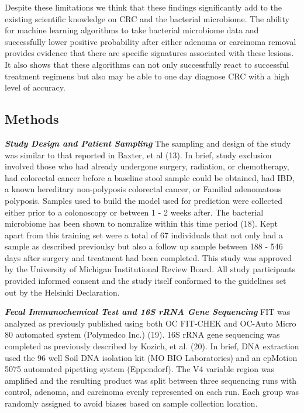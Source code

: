 \documentclass[12pt,]{article}
\begin{document}
Despite these limitations we think that these findings significantly add
to the existing scientific knowledge on CRC and the bacterial
microbiome. The ability for machine learning algorithms to take
bacterial microbiome data and successfully lower positive probability
after either adenoma or carcinoma removal provides evidence that there
are specific signatures associated with these lesions. It also shows
that these algorithms can not only successfully react to successful
treatment regimens but also may be able to one day diagnose CRC with a
high level of accuracy.

\newpage

\subsection{Methods}\label{methods}

\textbf{\emph{Study Design and Patient Sampling}} The sampling and
design of the study was similar to that reported in Baxter, et al (13).
In brief, study exclusion involved those who had already undergone
surgery, radiation, or chemotherapy, had colorectal cancer before a
baseline stool sample could be obtained, had IBD, a known hereditary
non-polyposis colorectal cancer, or Familial adenomatous polyposis.
Samples used to build the model used for prediction were collected
either prior to a colonoscopy or between 1 - 2 weeks after. The
bacterial microbiome has been shown to nomralize within this time period
(18). Kept apart from this training set were a total of 67 individuals
that not only had a sample as described previoulsy but also a follow up
sample between 188 - 546 days after surgery and treatment had been
completed. This study was approved by the University of Michigan
Institutional Review Board. All study participants provided informed
consent and the study itself conformed to the guidelines set out by the
Helsinki Declaration.

\textbf{\emph{Fecal Immunochemical Test and 16S rRNA Gene Sequencing}}
FIT was analyzed as previously published using both OC FIT-CHEK and
OC-Auto Micro 80 automated system (Polymedco Inc.) (19). 16S rRNA gene
sequencing was completed as previously described by Kozich, et al. (20).
In brief, DNA extraction used the 96 well Soil DNA isolation kit (MO BIO
Laboratories) and an epMotion 5075 automated pipetting system
(Eppendorf). The V4 variable region was amplified and the resulting
product was split between three sequencing runs with control, adenoma,
and carcinoma evenly represented on each run. Each group was randomly
assigned to avoid biases based on sample collection location.
\end{document}
